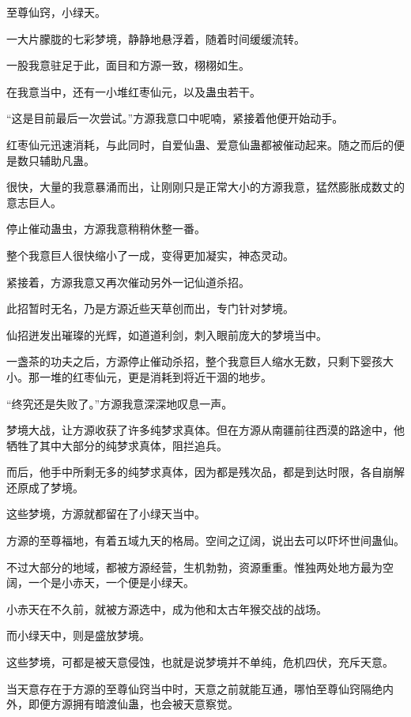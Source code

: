 
\begin{this_body}



至尊仙窍，小绿天。

一大片朦胧的七彩梦境，静静地悬浮着，随着时间缓缓流转。

一股我意驻足于此，面目和方源一致，栩栩如生。

在我意当中，还有一小堆红枣仙元，以及蛊虫若干。

“这是目前最后一次尝试。”方源我意口中呢喃，紧接着他便开始动手。

红枣仙元迅速消耗，与此同时，自爱仙蛊、爱意仙蛊都被催动起来。随之而后的便是数只辅助凡蛊。

很快，大量的我意暴涌而出，让刚刚只是正常大小的方源我意，猛然膨胀成数丈的意志巨人。

停止催动蛊虫，方源我意稍稍休整一番。

整个我意巨人很快缩小了一成，变得更加凝实，神态灵动。

紧接着，方源我意又再次催动另外一记仙道杀招。

此招暂时无名，乃是方源近些天草创而出，专门针对梦境。

仙招迸发出璀璨的光辉，如道道利剑，刺入眼前庞大的梦境当中。

一盏茶的功夫之后，方源停止催动杀招，整个我意巨人缩水无数，只剩下婴孩大小。那一堆的红枣仙元，更是消耗到将近干涸的地步。

“终究还是失败了。”方源我意深深地叹息一声。

梦境大战，让方源收获了许多纯梦求真体。但在方源从南疆前往西漠的路途中，他牺牲了其中大部分的纯梦求真体，阻拦追兵。

而后，他手中所剩无多的纯梦求真体，因为都是残次品，都是到达时限，各自崩解还原成了梦境。

这些梦境，方源就都留在了小绿天当中。

方源的至尊福地，有着五域九天的格局。空间之辽阔，说出去可以吓坏世间蛊仙。

不过大部分的地域，都被方源经营，生机勃勃，资源重重。惟独两处地方最为空阔，一个是小赤天，一个便是小绿天。

小赤天在不久前，就被方源选中，成为他和太古年猴交战的战场。

而小绿天中，则是盛放梦境。

这些梦境，可都是被天意侵蚀，也就是说梦境并不单纯，危机四伏，充斥天意。

当天意存在于方源的至尊仙窍当中时，天意之前就能互通，哪怕至尊仙窍隔绝内外，即便方源拥有暗渡仙蛊，也会被天意察觉。


\end{this_body}
